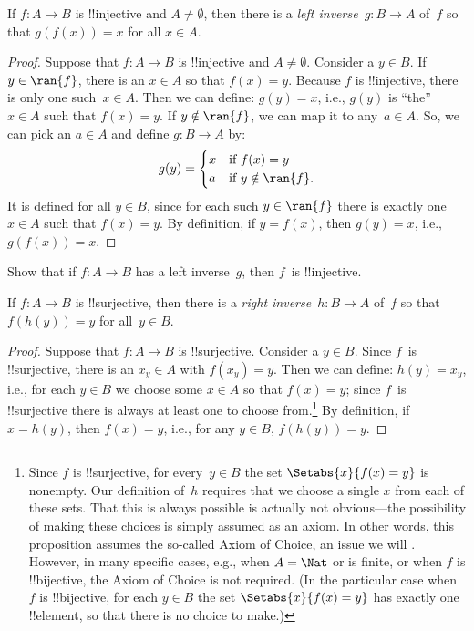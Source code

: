 \documentclass[../../../include/open-logic-section]{subfiles}
\begin{document}
\begin{prop}
If $f\colon A \to B$ is !!{injective} and $A \neq \emptyset$, then there is a \emph{left
inverse}~$g\colon B \to A$ of~$f$ so that $g(f(x)) = x$ for all $x
\in A$.
\end{prop}

\begin{proof}
Suppose that $f\colon A \to B$ is !!{injective} and $A \neq \emptyset$. Consider a $y \in B$.
If $y \in \ran{f}$, there is an $x \in A$ so that $f(x) = y$. Because
$f$ is !!{injective}, there is only one such~$x \in A$. Then we can
define: $g(y) = x$, i.e., $g(y)$ is ``the'' $x \in A$ such that $f(x)
= y$.  If $y \notin \ran{f}$, we can map it to any~$a \in A$. So, we
can pick an $a \in A$ and define $g\colon B \to A$ by:
\[
g(y) = \begin{cases}
    x & \text{if $f(x) = y$}\\
    a & \text{if $y \notin \ran{f}$.}
\end{cases}
\]
It is defined for all $y \in B$, since for each such $y \in \ran{f}$
there is exactly one $x \in A$ such that $f(x) = y$. By definition, if
$y = f(x)$, then $g(y) = x$, i.e., $g(f(x)) = x$.
\end{proof}

\begin{prob}
Show that if $f\colon A \to B$ has a left inverse~$g$, then $f$~is
!!{injective}.
\end{prob}

\begin{prop}
    If $f\colon A \to B$ is !!{surjective}, then there is a
    \emph{right inverse}~$h\colon B \to A$ of~$f$ so that $f(h(y)) =
    y$ for all~$y \in B$.
\end{prop}

\begin{proof}
Suppose that $f\colon A \to B$ is !!{surjective}. Consider a $y \in
B$. Since $f$~is !!{surjective}, there is an $x_y \in A$ with $f(x_y)
= y$.  Then we can define: $h(y) = x_y$, i.e., for each $y \in B$ we
choose some $x \in A$ so that $f(x) = y$; since $f$~is !!{surjective}
there is always at least one to choose from.\footnote{Since $f$ is
!!{surjective}, for every~$y \in B$ the set $\Setabs{x}{f(x) = y}$ is
nonempty. Our definition of~$h$ requires that we choose a single $x$
from each of these sets. That this is always possible is actually not
obvious---the possibility of making these choices is simply assumed as an axiom. 
In other words, this proposition assumes the so-called Axiom of
Choice, an issue we will . 
However, in many specific cases, e.g., when $A = \Nat$ or is finite, or when $f$ is !!{bijective},
the Axiom of Choice is not required. (In the particular case when $f$ is !!{bijective}, for each $y \in B$ the set 
$\Setabs{x}{f(x) = y}$ has exactly one !!{element}, so that there is no choice to make.)} 
By definition, if $x = h(y)$,
then $f(x) = y$, i.e., for any $y \in B$, $f(h(y)) = y$.
\end{proof}
\end{document}
